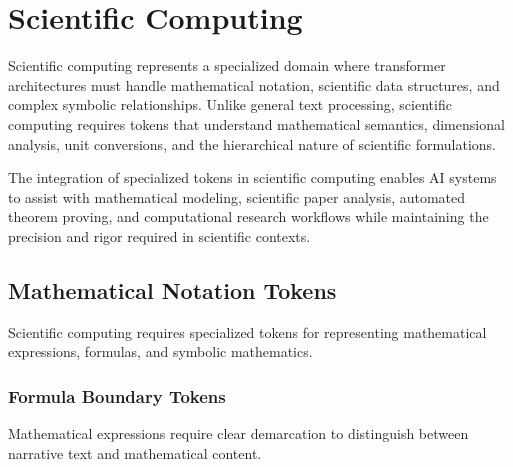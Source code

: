 
\section{Scientific Computing}

Scientific computing represents a specialized domain where transformer architectures must handle mathematical notation, scientific data structures, and complex symbolic relationships. Unlike general text processing, scientific computing requires tokens that understand mathematical semantics, dimensional analysis, unit conversions, and the hierarchical nature of scientific formulations.

The integration of specialized tokens in scientific computing enables AI systems to assist with mathematical modeling, scientific paper analysis, automated theorem proving, and computational research workflows while maintaining the precision and rigor required in scientific contexts.

\subsection{Mathematical Notation Tokens}

Scientific computing requires specialized tokens for representing mathematical expressions, formulas, and symbolic mathematics.

\subsubsection{Formula Boundary Tokens}

Mathematical expressions require clear demarcation to distinguish between narrative text and mathematical content.

